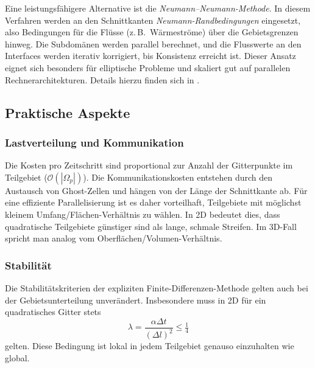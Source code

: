 \begin{itemize}
	Eine leistungsfähigere Alternative ist die \emph{Neumann--Neumann-Methode}.  
	In diesem Verfahren werden an den Schnittkanten \emph{Neumann-Randbedingungen} eingesetzt, also Bedingungen für die Flüsse (z.\,B.\ Wärmeströme) über die Gebietsgrenzen hinweg.  
%
	Die Subdomänen werden parallel berechnet, und die Flusswerte an den Interfaces werden iterativ korrigiert, bis Konsistenz erreicht ist.  
	Dieser Ansatz eignet sich besonders für elliptische Probleme und skaliert gut auf parallelen Rechnerarchitekturen.  
	Details hierzu finden sich in \cite{parallelisierung:gander2019}.
\end{itemize}


\subsection{Praktische Aspekte}

\subsubsection {Lastverteilung und Kommunikation}
Die Kosten pro Zeitschritt sind proportional zur Anzahl der Gitterpunkte im Teilgebiet 
($\mathcal{O}(|\Omega_p|)$).  
Die Kommunikationskosten entstehen durch den Austausch von Ghost-Zellen und hängen von der Länge der Schnittkante ab.  
%
Für eine effiziente Parallelisierung ist es daher vorteilhaft, Teilgebiete mit möglichst kleinem 
Umfang/Flächen-Verhältnis zu wählen.  
In 2D bedeutet dies, dass quadratische Teilgebiete günstiger sind als lange, schmale Streifen.
Im 3D-Fall spricht man analog vom Oberflächen/Volumen-Verhältnis.  

\subsubsection {Stabilität}
Die Stabilitätskriterien der expliziten Finite-Differenzen-Methode gelten auch bei der Gebietsunterteilung unverändert.  
Insbesondere muss in 2D für ein quadratisches Gitter stets
\[
\lambda = \frac{\alpha \Delta t}{(\Delta l)^2} \leq \tfrac{1}{4}
\]
gelten.  
Diese Bedingung ist lokal in jedem Teilgebiet genauso einzuhalten wie global. 

